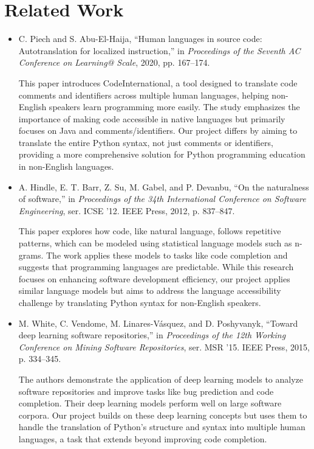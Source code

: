 \documentclass[9pt]{article}
\begin{document}
\section{Related Work}
    \begin{itemize}
        \item C. Piech and S. Abu-El-Haija, “Human languages in source code: Autotranslation for localized instruction,” in \textit{Proceedings of the Seventh AC Conference on Learning@ Scale}, 2020, pp. 167–174.

        This paper introduces CodeInternational, a tool designed to translate code comments and identifiers across multiple human languages, helping non-English speakers learn programming more easily. The study emphasizes the importance of making code accessible in native languages but primarily focuses on Java and comments/identifiers. Our project differs by aiming to translate the entire Python syntax, not just comments or identifiers, providing a more comprehensive solution for Python programming education in non-English languages.
        
        \item A. Hindle, E. T. Barr, Z. Su, M. Gabel, and P. Devanbu, “On the naturalness of software,” in \textit{Proceedings of the 34th International Conference on Software Engineering}, ser. ICSE ’12. IEEE Press, 2012, p. 837–847.
        
        This paper explores how code, like natural language, follows repetitive patterns, which can be modeled using statistical language models such as n-grams. The work applies these models to tasks like code completion and suggests that programming languages are predictable. While this research focuses on enhancing software development efficiency, our project applies similar language models but aims to address the language accessibility challenge by translating Python syntax for non-English speakers.
        
        \item M. White, C. Vendome, M. Linares-Vásquez, and D. Poshyvanyk, “Toward deep learning software repositories,” in \textit{Proceedings of the 12th Working Conference on Mining Software Repositories}, ser. MSR ’15. IEEE Press, 2015, p. 334–345.
        
        The authors demonstrate the application of deep learning models to analyze software repositories and improve tasks like bug prediction and code completion. Their deep learning models perform well on large software corpora. Our project builds on these deep learning concepts but uses them to handle the translation of Python's structure and syntax into multiple human languages, a task that extends beyond improving code completion.
        

\end{itemize}
\end{document}
